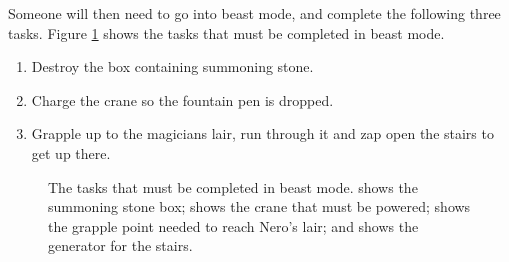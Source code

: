 \documentclass[11pt]{article} %
\begin{document}
	Someone will then need to go into beast mode, and complete the following three tasks. Figure \ref{fig:es} shows the tasks that must be completed in beast mode.

	\begin{enumerate}
		\item Destroy the box containing summoning stone.
		\item Charge the crane so the fountain pen is dropped.
		\item Grapple up to the magicians lair, run through it and zap open the stairs to get up there.
	\end{enumerate}

	\begin{figure}[b!]
		\centering
		\hfill
		\caption{
			The tasks that must be completed in beast mode.
			 shows the summoning stone box;
			 shows the crane that must be powered;
			 shows the grapple point needed to reach Nero's lair;
			and  shows the generator for the stairs.
			}
		\label{fig:es}
	\end{figure}
\end{document}
